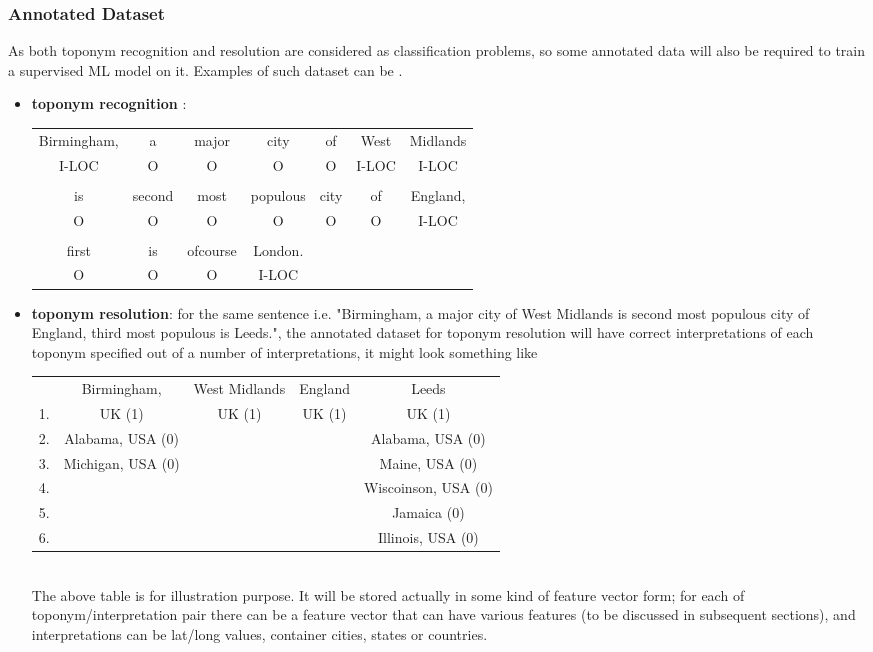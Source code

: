\documentclass[
     11pt,         %
     a4paper,      %
     oneside,
     ]{article}
\begin{document}
\subsubsection{Annotated Dataset}
As both toponym recognition and resolution are considered as classification problems, so some annotated data will also be required to train a supervised ML model on  it. Examples of such dataset can be
.  \begin{itemize}
	\item \textbf{toponym recognition }: \\
	{
	\selectfont
	\begin{tabular}{ c c c c c c c}
		
		Birmingham, & a & major & city & of & West & Midlands \\
		I-LOC & O & O & O & O & I-LOC & I-LOC \\
		{} \\
		is & second & most & populous & city & of & England,\\
		O & O & O & O & O & O & I-LOC \\
		{} \\
		first & is & ofcourse & London. \\
		O & O & O & I-LOC \\
	\end{tabular}
	}
	\item \textbf{toponym resolution}: for the same sentence i.e. "Birmingham, a major city of West Midlands is second most populous city of England, third most populous is Leeds.", the annotated dataset for toponym resolution will have correct interpretations of each toponym specified out of a number of interpretations, it might look something like \\
	
	{
		\selectfont
		\begin{tabular}{ c| c | c | c | c }
			
			{} & Birmingham, &  West Midlands & England & Leeds\\
			1. & UK (1) & UK (1) & UK (1) & UK (1) \\
			2. & Alabama, USA (0)& {} & {} & Alabama, USA (0)\\
			3. & Michigan, USA (0)& {} & {} & Maine, USA (0)\\
			4. & {} & {} & {} & Wiscoinson, USA (0)\\
			5. & {} & {} & {} & Jamaica (0)\\
			6. & {} & {} & {} & Illinois, USA (0)\\
		\end{tabular}
	}
	{}\\
	The above table is for illustration purpose. It will be stored actually in some kind of feature vector form; for each of toponym/interpretation pair there can be a feature vector that can have various features (to be discussed in subsequent sections), and interpretations can be lat/long values, container cities, states or countries. 
\end{itemize}
\end{document}
